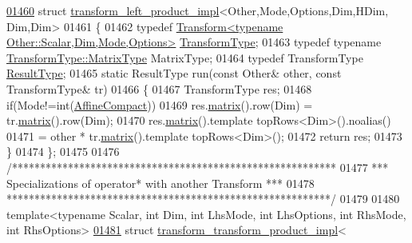 \begin{DoxyCode}
\hyperlink{struct_eigen_1_1internal_1_1transform__left__product__impl_3_01_other_00_01_mode_00_01_options_0b0d1bc6bb0265d07cac191ec3dc368a3}{01460} \textcolor{keyword}{struct }\hyperlink{struct_eigen_1_1internal_1_1transform__left__product__impl}{transform\_left\_product\_impl}<Other,Mode,Options,Dim,HDim, Dim,Dim>
01461 \{
01462   \textcolor{keyword}{typedef} \hyperlink{group___geometry___module_class_eigen_1_1_transform}{Transform<typename Other::Scalar,Dim,Mode,Options>}
       \hyperlink{group___geometry___module_class_eigen_1_1_transform}{TransformType};
01463   \textcolor{keyword}{typedef} \textcolor{keyword}{typename} \hyperlink{group___core___module_class_eigen_1_1_matrix}{TransformType::MatrixType} MatrixType;
01464   \textcolor{keyword}{typedef} TransformType \hyperlink{group___geometry___module_class_eigen_1_1_transform}{ResultType};
01465   \textcolor{keyword}{static} ResultType run(\textcolor{keyword}{const} Other& other, \textcolor{keyword}{const} TransformType& tr)
01466   \{
01467     TransformType res;
01468     \textcolor{keywordflow}{if}(Mode!=\textcolor{keywordtype}{int}(\hyperlink{group__enums_ggaee59a86102f150923b0cac6d4ff05107aa30a06b60d218b709020972df47de2b0}{AffineCompact}))
01469       res.\hyperlink{group___geometry___module_aec8168000a88a807130d41020af98d47}{matrix}().row(Dim) = tr.\hyperlink{group___geometry___module_aec8168000a88a807130d41020af98d47}{matrix}().row(Dim);
01470     res.\hyperlink{group___geometry___module_aec8168000a88a807130d41020af98d47}{matrix}().template topRows<Dim>().noalias()
01471       = other * tr.\hyperlink{group___geometry___module_aec8168000a88a807130d41020af98d47}{matrix}().template topRows<Dim>();
01472     \textcolor{keywordflow}{return} res;
01473   \}
01474 \};
01475 
01476 \textcolor{comment}{/**********************************************************}
01477 \textcolor{comment}{*** Specializations of operator* with another Transform ***}
01478 \textcolor{comment}{**********************************************************/}
01479 
01480 \textcolor{keyword}{template}<\textcolor{keyword}{typename} Scalar, \textcolor{keywordtype}{int} Dim, \textcolor{keywordtype}{int} LhsMode, \textcolor{keywordtype}{int} LhsOptions, \textcolor{keywordtype}{int} RhsMode, \textcolor{keywordtype}{int} RhsOptions>
\hyperlink{struct_eigen_1_1internal_1_1transform__transform__product__impl_3_01_transform_3_01_scalar_00_01fe1fb77c9f6edc527bf418dd10ef65b9}{01481} \textcolor{keyword}{struct }\hyperlink{struct_eigen_1_1internal_1_1transform__transform__product__impl}{transform\_transform\_product\_impl}<

\end{DoxyCode}
